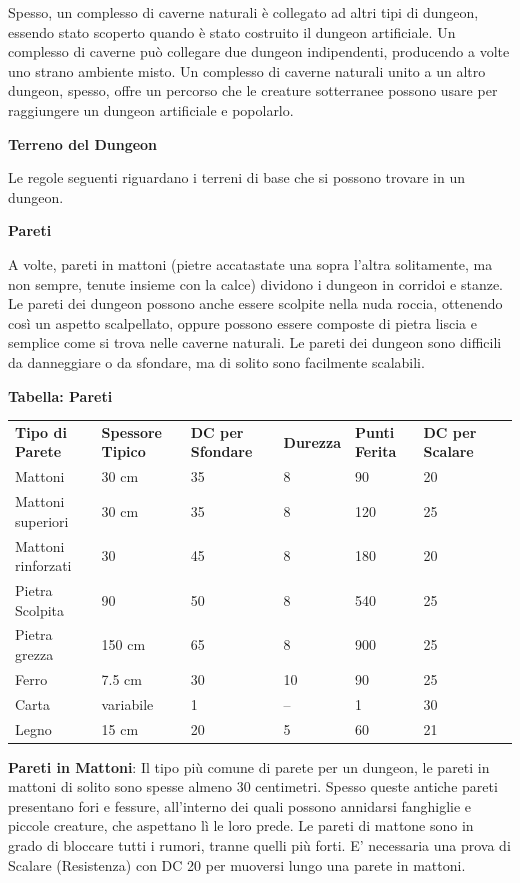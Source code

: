 \documentclass[a4paper,11pt,twoside,openany]{book}
\begin{document}
Spesso, un complesso di caverne naturali è collegato ad altri tipi di dungeon, essendo stato scoperto quando è stato costruito il dungeon artificiale. Un complesso di caverne può collegare due dungeon indipendenti, producendo a volte uno strano ambiente misto. Un complesso di caverne naturali unito a un altro dungeon, spesso, offre un percorso che le creature sotterranee possono usare per raggiungere un dungeon artificiale e popolarlo.

\textbf{Terreno del Dungeon}

Le regole seguenti riguardano i terreni di base che si possono trovare in un dungeon.

\textbf{Pareti}

A volte, pareti in mattoni (pietre accatastate una sopra l'altra solitamente, ma non sempre, tenute insieme con la calce) dividono i dungeon in corridoi e stanze. Le pareti dei dungeon possono anche essere scolpite nella nuda roccia, ottenendo così un aspetto scalpellato, oppure possono essere composte di pietra liscia e semplice come si trova nelle caverne naturali. Le pareti dei dungeon sono difficili da danneggiare o da sfondare, ma di solito sono facilmente scalabili.

\bigskip

\textbf{Tabella: Pareti}
\medskip

\begin{tabular}{L{3cm}L{2.5cm}L{2cm}L{2cm}L{2cm}L{2.5cm}L{2cm}}
	\toprule
	\textbf{Tipo di Parete} & \textbf{Spessore Tipico} & \textbf{DC per Sfondare} & \textbf{Durezza} & \textbf{Punti Ferita} & \textbf{DC per Scalare}\tabularnewline
	Mattoni  & 30 cm& 35   & 8 & 90& 20\tabularnewline
	Mattoni superiori  & 30 cm& 35   & 8 & 120    & 25\tabularnewline
	Mattoni rinforzati & 30   & 45   & 8 & 180    & 20\tabularnewline
	Pietra Scolpita    & 90   & 50   & 8 & 540    & 25\tabularnewline
	Pietra grezza & 150 cm    & 65   & 8 & 900    & 25\tabularnewline
	Ferro    & 7.5 cm    & 30   & 10& 90& 25\tabularnewline
	Carta    & variabile & 1    & --& 1 & 30\tabularnewline
	Legno    & 15 cm& 20   & 5 & 60& 21\tabularnewline
\end{tabular}

\bigskip

\textbf{Pareti in Mattoni}: Il tipo più comune di parete per un dungeon, le pareti in mattoni di solito sono spesse almeno 30 centimetri. Spesso queste antiche pareti presentano fori e fessure, all'interno dei quali possono annidarsi fanghiglie e piccole creature, che aspettano lì le loro prede. Le pareti di mattone sono in grado di bloccare tutti i rumori, tranne quelli più forti. E' necessaria una prova di Scalare (Resistenza) con DC 20 per muoversi lungo una parete in mattoni.
\end{document}

